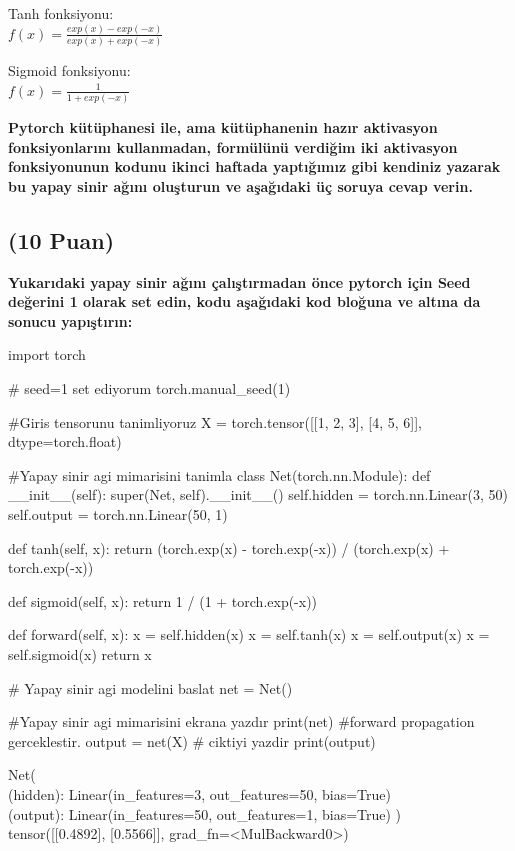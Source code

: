 \documentclass[11pt]{article}
\begin{document}
Tanh fonksiyonu:\\
$f(x) = \frac{exp(x) - exp(-x)}{exp(x) + exp(-x)}$
\vspace{.2in}

Sigmoid fonksiyonu:\\
$f(x) = \frac{1}{1 + exp(-x)}$

\vspace{.2in}
 \textbf{Pytorch kütüphanesi ile, ama kütüphanenin hazır aktivasyon fonksiyonlarını kullanmadan, formülünü verdiğim iki aktivasyon fonksiyonunun kodunu ikinci haftada yaptığımız gibi kendiniz yazarak bu yapay sinir ağını oluşturun ve aşağıdaki üç soruya cevap verin.}
 
\subsection{(10 Puan)} \textbf{Yukarıdaki yapay sinir ağını çalıştırmadan önce pytorch için Seed değerini 1 olarak set edin, kodu aşağıdaki kod bloğuna ve altına da sonucu yapıştırın:}

\begin{python}
import torch

# seed=1 set ediyorum
torch.manual_seed(1)

#Giris tensorunu tanimliyoruz
X = torch.tensor([[1, 2, 3], [4, 5, 6]], dtype=torch.float)

#Yapay sinir agi mimarisini tanimla
class Net(torch.nn.Module):
    def __init__(self):
        super(Net, self).__init__()
        self.hidden = torch.nn.Linear(3, 50)
        self.output = torch.nn.Linear(50, 1)
        
    def tanh(self, x):
        return (torch.exp(x) - torch.exp(-x)) / (torch.exp(x) + torch.exp(-x))
    
    def sigmoid(self, x):
        return 1 / (1 + torch.exp(-x))
        
    def forward(self, x):
        x = self.hidden(x)
        x = self.tanh(x)
        x = self.output(x)
        x = self.sigmoid(x)
        return x

# Yapay sinir agi modelini baslat  
net = Net()

#Yapay sinir agi mimarisini ekrana yazdır
print(net)
#forward propagation gerceklestir.
output = net(X)
# ciktiyi yazdir
print(output)
\end{python}

Net(\\
  (hidden): Linear(in_features=3, out_features=50, bias=True)\\
  (output): Linear(in_features=50, out_features=1, bias=True)
)\\
tensor([[0.4892],
                [0.5566]], grad_fn=<MulBackward0>)
\end{document}
